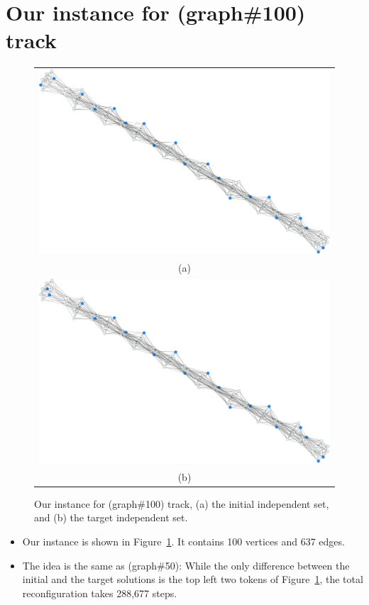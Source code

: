 \documentclass{article}
\begin{document}
\section{Our instance for (graph\#100) track}
	\begin{figure}[t]
		\begin{tabular}{c}
			\begin{minipage}[t]{1.0\hsize}
				\centering
				\includegraphics[scale=0.2]{100_s.png}
			\end{minipage}
		\\
		(a)
		\\
			\begin{minipage}[t]{1.0\hsize}
				\centering
				\includegraphics[scale=0.2]{100_t.png}
			\end{minipage}
		\\
		(b)
		\end{tabular}
		\caption{Our instance for (graph\#100) track, (a) the initial independent set, and (b) the target independent set.}
		\label{figure_100instance}
	\end{figure}
\begin{itemize}
\item Our instance is shown in Figure~\ref{figure_100instance}. It contains 100 vertices and 637 edges.
\item The idea is the same as (graph\#50): While the only difference between the initial and the target solutions is the top left two tokens of Figure~\ref{figure_100instance}, the total reconfiguration takes 288,677 steps.
\end{itemize}
\end{document}
